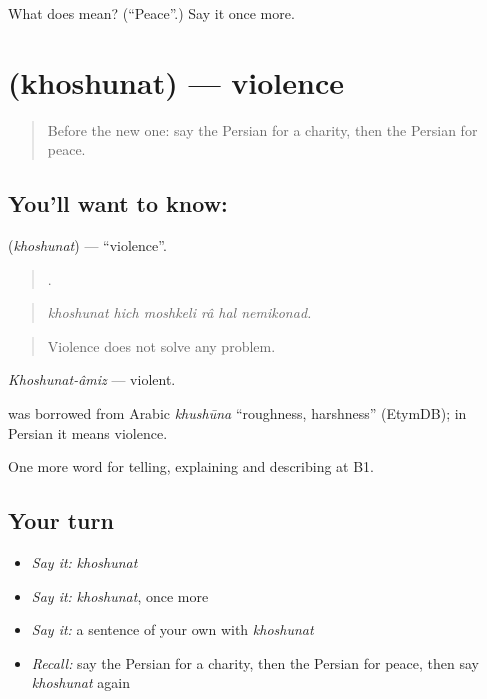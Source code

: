 \begin{tcolorbox}[breakable,colback=teal!4,colframe=teal!35!black,title={Before you move on}]
What does  mean? (\textquotedblleft{}Peace\textquotedblright{}.) Say it once more.
\end{tcolorbox}
\section[\texorpdfstring{\fa{خشونت} (khoshunat)}{خشونت (khoshunat)}]{ (khoshunat) — violence}

\label{lesson:FA-C389-khoshunat}



\begin{quote}
Before the new one: say the Persian for a charity, then the Persian for peace.
\end{quote}

\subsection*{You'll want to know: }
\textbf{} (\emph{khoshunat}) — \textquotedblleft{}violence\textquotedblright{}.

\begin{quote}
     .
\end{quote}

\begin{quote}
\emph{khoshunat hich moshkeli râ hal nemikonad.}
\end{quote}

\begin{quote}
Violence does not solve any problem.
\end{quote}

\emph{Khoshunat-âmiz} — violent.

\begin{cousinweb}
\textbf{} was borrowed from Arabic \emph{khushūna} \textquotedblleft{}roughness, harshness\textquotedblright{} (EtymDB); in Persian it means violence.
\end{cousinweb}

\begin{grammarlens}[title={What you've built}]
One more word for telling, explaining and describing at B1.
\end{grammarlens}

\subsection*{Your turn}
\begin{itemize}
\raggedright
  \item \emph{Say it:} \emph{khoshunat}
  \item \emph{Say it:} \emph{khoshunat}, once more
  \item \emph{Say it:} a sentence of your own with \emph{khoshunat}
  \item \emph{Recall:} say the Persian for a charity, then the Persian for peace, then say \emph{khoshunat} again
\end{itemize}

